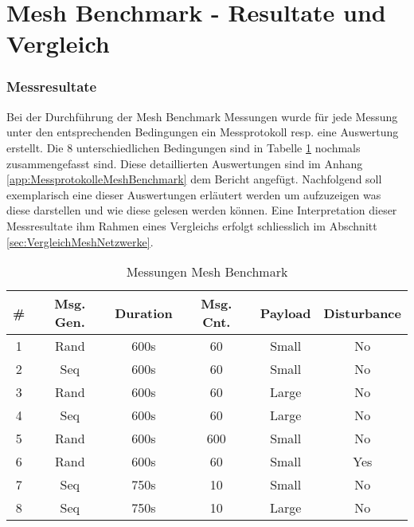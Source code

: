 \vspace*{4cm}
\part{Mesh Benchmark - Resultate und Vergleich}\label{part:MeshBenchmarkResultateundVergleich}
\vspace*{\fill}
\clearpage

\section{Messresultate}\label{sec:Messresultate}
Bei der Durchführung der Mesh Benchmark Messungen wurde für jede Messung unter den entsprechenden Bedingungen ein Messprotokoll resp. eine Auswertung erstellt. Die 8 unterschiedlichen Bedingungen sind in Tabelle \ref{tab:MessungenMeshBenchmark} nochmals zusammengefasst sind.
Diese detaillierten Auswertungen sind im Anhang \ref{app:MessprotokolleMeshBenchmark} dem Bericht angefügt.
Nachfolgend soll exemplarisch eine dieser Auswertungen erläutert werden um aufzuzeigen was diese darstellen und wie diese gelesen werden können.
Eine Interpretation dieser Messresultate ihm Rahmen eines Vergleichs erfolgt schliesslich im Abschnitt \ref{sec:VergleichMeshNetzwerke}.

\begin{table}[h]
\centering
\begin{tabular}{|c|c|c|c|c|c|} 
\hline
\textbf{\#}  & \textbf{Msg. Gen.}  & \textbf{Duration}  & \textbf{Msg. Cnt.}  & \textbf{Payload }  & \textbf{Disturbance}  \\ 
\hline
1 & Rand & 600s & 60 & Small & No \\ 
\hline
2 & Seq & 600s & 60 & Small & No \\ 
\hline
3 & Rand & 600s & 60 & Large & No \\ 
\hline
4 & Seq & 600s & 60 & Large & No \\ 
\hline
5 & Rand & 600s & 600 & Small & No \\ 
\hline
6 & Rand & 600s & 60 & Small & Yes \\ 
\hline
7 & Seq & 750s & 10 & Small & No \\ 
\hline
8 & Seq & 750s & 10 & Large & No \\
\hline
\end{tabular}
\caption{Messungen Mesh Benchmark}
\label{tab:MessungenMeshBenchmark}
\end{table}


